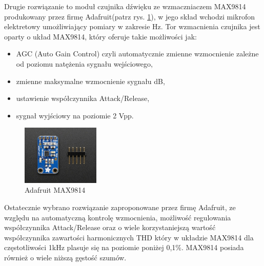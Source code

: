 \documentclass[eng,printmode]{mgr}
\begin{document}
 Drugie rozwiązanie to moduł czujnika dźwięku ze wzmaczniaczem MAX9814 produkowany przez firmę Adafruit(patrz rys. \ref{fig-max9814}), w jego skład wchodzi mikrofon elektretowy umożliwiający pomiary w zakresie \unit[20-20000]{Hz}. Tor wzmacnienia czujnika jest oparty o układ MAX9814, który oferuje takie możliwości jak:
\begin{itemize}
\item AGC (Auto Gain Control) czyli automatycznie zmienne wzmocnienie zależne od poziomu natężenia sygnału wejściowego,
\item zmienne maksymalne wzmocnienie sygnału \unit[40,50,60]{dB},
\item ustawienie współczynnika Attack/Release, 
\item sygnał wyjściowy na poziomie 2 Vpp.
\end{itemize}
\newpage
\begin{figure}

    \centering

  \includegraphics[width=0.33\textwidth, angle=0]{detektor2.jpg}

    \caption{Adafruit MAX9814 \cite{max9814}}

    \label{fig-max9814}

\end{figure}

Ostatecznie wybrano rozwiązanie zaproponowane przez firmę Adafruit, ze względu na automatyczną kontrolę wzmocnienia, możliwość regulowania współczynnika Attack/Release oraz o wiele korzystaniejszą wartość współczynnika zawartości harmonicznych THD który w układzie MAX9814 dla częstotliwości 1kHz plasuje się na poziomie poniżej 0,1\%. MAX9814 posiada również o wiele niższą gęstość szumów.
\end{document}
